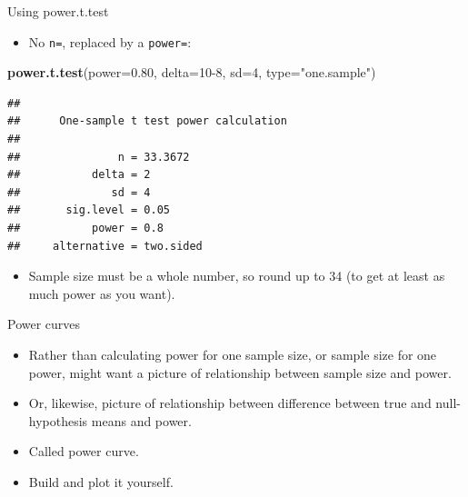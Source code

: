 \documentclass[
  ignorenonframetext,
]{beamer}
\newenvironment{Shaded}{\begin{snugshade}}{\end{snugshade}}
\newcommand{\DataTypeTok}[1]{\textcolor[rgb]{0.13,0.29,0.53}{#1}}
\newcommand{\DecValTok}[1]{\textcolor[rgb]{0.00,0.00,0.81}{#1}}
\newcommand{\FloatTok}[1]{\textcolor[rgb]{0.00,0.00,0.81}{#1}}
\newcommand{\KeywordTok}[1]{\textcolor[rgb]{0.13,0.29,0.53}{\textbf{#1}}}
\newcommand{\NormalTok}[1]{#1}
\newcommand{\StringTok}[1]{\textcolor[rgb]{0.31,0.60,0.02}{#1}}
\providecommand{\tightlist}{%
  \setlength{\itemsep}{0pt}\setlength{\parskip}{0pt}}
\begin{document}
\begin{frame}[fragile]{Using power.t.test}
\protect\hypertarget{using-power.t.test}{}

\begin{itemize}
\tightlist
\item
  No \texttt{n=}, replaced by a \texttt{power=}:
\end{itemize}

\begin{Shaded}
\begin{Highlighting}[]
\KeywordTok{power.t.test}\NormalTok{(}\DataTypeTok{power=}\FloatTok{0.80}\NormalTok{, }\DataTypeTok{delta=}\DecValTok{10-8}\NormalTok{, }\DataTypeTok{sd=}\DecValTok{4}\NormalTok{, }\DataTypeTok{type=}\StringTok{"one.sample"}\NormalTok{)}
\end{Highlighting}
\end{Shaded}

\begin{verbatim}
## 
##      One-sample t test power calculation 
## 
##               n = 33.3672
##           delta = 2
##              sd = 4
##       sig.level = 0.05
##           power = 0.8
##     alternative = two.sided
\end{verbatim}

\begin{itemize}
\tightlist
\item
  Sample size must be a whole number, so round up to 34 (to get at least
  as much power as you want).
\end{itemize}

\end{frame}

\begin{frame}{Power curves}
\protect\hypertarget{power-curves}{}

\begin{itemize}
\tightlist
\item
  Rather than calculating power for one sample size, or sample size for
  one power, might want a picture of relationship between sample size
  and power.
\item
  Or, likewise, picture of relationship between difference between true
  and null-hypothesis means and power.
\item
  Called power curve.
\item
  Build and plot it yourself.
\end{itemize}

\end{frame}
\end{document}
